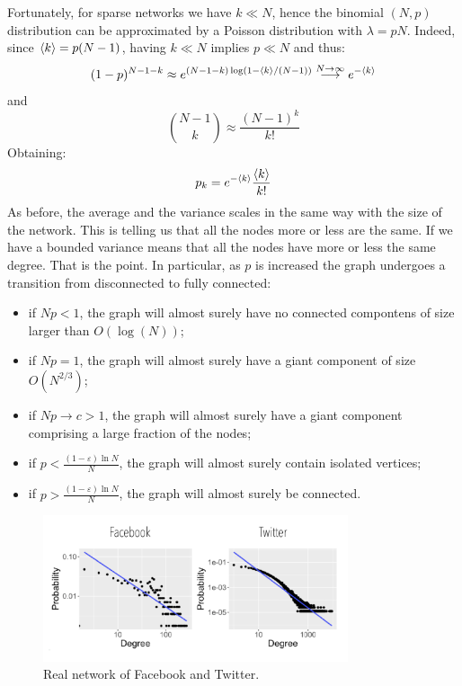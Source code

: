 \documentclass[../main/main.tex]{subfiles}
\begin{document}
Fortunately, for sparse networks we have \( k \ll N \), hence the binomial \( (N,p) \) distribution can be approximated by a Poisson distribution with \( \lambda = p N \). Indeed, since  \( \expval{k} = p(N-1)  \), having \( k \ll N \) implies \( p \ll N \) and thus:
\begin{equation*}
  (1-p)^{N-1-k} \approx e^{(N-1-k) \log (1- \expval{k}/(N-1) )} \overset{N \rightarrow \infty }{\longrightarrow } e^{- \expval{k} }
\end{equation*}
and
\begin{equation*}
  \binom{N-1}{k} \approx \frac{(N-1)^k}{k!}
\end{equation*}
Obtaining:
\begin{equation}
  p_k = e^{- \expval{k} } \frac{\expval{k} }{k!}
\end{equation}
As before, the average and the variance scales in the same way with the size of the network. This is telling us that all the nodes more or less are the same. If we have a bounded variance means that all the nodes have more or less the same degree. That is the point.
In particular, as $p$ is increased the graph undergoes a transition from disconnected to fully connected:
\begin{itemize}
\item if \( N p < 1 \), the graph will almost surely have no connected compontens of size larger than \( O(\log(N)) \);
\item if \( N p = 1 \), the graph will almost surely have a giant component of size \( O(N^{2/3}) \);
\item if \( N p \rightarrow c > 1 \), the graph will almost surely have a giant component comprising a large fraction of the nodes;
\item if \( p < \frac{(1- \varepsilon )\ln N}{N} \), the graph will almost surely contain isolated vertices;
\item if \( p > \frac{(1- \varepsilon )\ln N}{N} \),  the graph will almost surely be connected.
\end{itemize}

\begin{figure}[h!]
\centering
\includegraphics[width=0.8\textwidth]{../lessons/image/06/4.png}
\caption{\label{fig:06_4} Real network of Facebook and Twitter.}
\end{figure}
\end{document}
